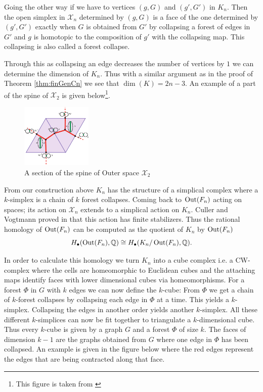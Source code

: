 Going the other way if we have to vertices $(g,G)$ and $(g',G')$ in $K_{n}$. Then the open simplex in $\mathcal{X}_{n}$ 
determined by $(g,G)$ is a face of  the one determined by $(g',G')$ exactly when $G$ is obtained from $G'$ 
by collapsing a forest of edges in $G'$ and  $g$ is homotopic to the composition of $g'$ with the collapsing map.
This collapsing is also called a forest collapse.

Through this as collapsing an edge decreases the number of vertices by $1$ we can determine the dimension of $K_{n}$.
Thus with a similar argument as in the proof of Theorem \ref{thm:finGenCn} we see that $\dim(K) = 2n -3$.
An example of a part of the spine of $\mathcal{X}_{2}$ is given below\footnote{This figure is taken from \cite{vogtmann02}}. 

\begin{figure}[h]
	\centering
	\includegraphics[width=0.3\textwidth]{./Images/spineOfOuterSpace.pdf}
	\caption{A section of the spine of Outer space $\mathcal{X}_{2}$}
\end{figure}

From our construction above $K_{n}$ has the structure of a simplical complex where a $k$-simplex
is a chain of $k$ forest collapses. Coming back to $\operatorname{Out}(F_{n})$ acting on spaces; its action on $\mathcal{X}_{n}$ extends to a simplical action on $K_{n}$.
Culler and Vogtmann proved in \cite{vogtmann86} that this action has finite stabilizers.
Thus the rational homology of $\operatorname{Out}(F_{n})$ can be computed as the quotient of $K_{n}$ by $\operatorname{Out}(F_{n})$
\[
	H_{\bullet}(\operatorname{Out}(F_{n}),\mathbb{Q}) \cong H_{\bullet}(K_{n}/ \operatorname{Out}(F_{n}),\mathbb{Q})
.\] 

In order to calculate this homology we turn $K_{n}$ into a cube complex i.e. a CW-complex where the cells are homeomorphic
to Euclidean cubes and the attaching maps identify faces with lower dimensional cubes via homeomorphisms.
For a forest $\Phi$ in $G$ with $k$ edges we can now define the $k$-cube:
From $\Phi$ we get a chain of $k$-forest collapses by collapsing each edge in $\Phi$ at a time.
This yields a $k$-simplex. Collapsing the edges in another order yields another $k$-simplex.
All these different $k$-simplices can now be fit together to triangulate a $k$-dimensional cube.
Thus every $k$-cube is given by a graph $G$ and a forest $\Phi$ of size $k$.
The faces of dimension $k-1$ are the graphs obtained from $G$ where one edge in $\Phi$ has been collapsed.
An example is given in the figure below where the red edges represent the edges that are being contracted along that face.

